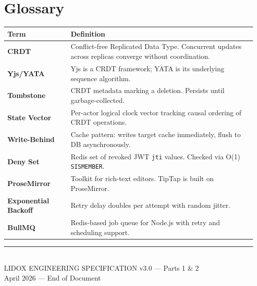 \documentclass[10pt, a4paper]{article}
\newcommand{\lightrule}{{\color{border}\rule{\textwidth}{0.4pt}}}
\begin{document}
\section{Glossary}

{\small
\begin{tabularx}{\textwidth}{@{}>{\bfseries\sffamily}lX@{}}
\toprule
\textsf{Term} & \textsf{Definition} \\
\midrule
CRDT & Conflict-free Replicated Data Type. Concurrent updates across replicas converge without coordination. \\
Yjs/YATA & Yjs is a CRDT framework; YATA is its underlying sequence algorithm. \\
Tombstone & CRDT metadata marking a deletion. Persists until garbage-collected. \\
State Vector & Per-actor logical clock vector tracking causal ordering of CRDT operations. \\
Write-Behind & Cache pattern: writes target cache immediately, flush to DB asynchronously. \\
Deny Set & Redis set of revoked JWT \texttt{jti} values. Checked via O(1) \texttt{SISMEMBER}. \\
ProseMirror & Toolkit for rich-text editors. TipTap is built on ProseMirror. \\
Exponential Backoff & Retry delay doubles per attempt with random jitter. \\
BullMQ & Redis-based job queue for Node.js with retry and scheduling support. \\
\bottomrule
\end{tabularx}
}

\vfill\lightrule\vspace{6pt}
\begin{center}
\\[4pt]
{\small\color{inkMuted}\textsf{LIDOX ENGINEERING SPECIFICATION v3.0 --- Parts 1 \& 2}}\\[2pt]
{\scriptsize\color{inkFaint}\textsf{April 2026 --- End of Document}}
\end{center}
\end{document}
